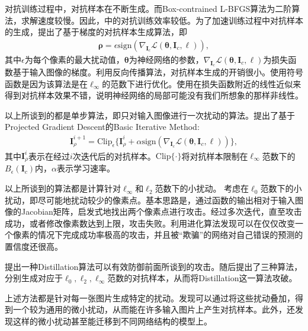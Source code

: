 对抗训练过程中，对抗样本在不断生成。而Box-contrained L-BFGS算法为二阶算法，求解速度较慢。因此，\cite{szegedy2014intriguing}中的对抗训练效率较低。为了加速训练过程中对抗样本的生成，\citet{goodfellow2015explaining}提出了基于梯度的对抗样本生成算法，即
\begin{align}
\bm{\rho} = \epsilon \text{sign} (\nabla_{\bm{I}_c} \mathcal{L} (\bm{\theta}, \bm{I}_c, \ell)),
\end{align}
其中$\epsilon$为每个像素的最大扰动值，$\bm{\theta}$为神经网络的参数，$\nabla_{\bm{I}_c} \mathcal{L} (\bm{\theta}, \bm{I}_c, \ell)$为损失函数基于输入图像的梯度。利用反向传播算法，对抗样本生成的开销很小。使用符号函数是因为该算法是在$\ell_\infty$的范数下进行优化。\citet{goodfellow2015explaining}使用在损失函数附近的线性近似来得到对抗样本效果不错，说明神经网络的局部可能没有我们所想象的那样非线性。

以上所谈到的都是单步算法，即只对输入图像进行一次扰动的算法。\citet{kurakin2016adversarial}提出了基于Projected Gradient Descent的Basic Iterative Method:
\begin{align}
\bm{I}_\rho^{i+1} = \text{Clip}_\epsilon \{\bm{I}_\rho^i + \alpha \text{sign} (\nabla_{\bm{I}_c} \mathcal{L} (\bm{\theta}, \bm{I}_c, \ell))\},
\end{align}
其中$\bm{I}_\rho^i$表示在经过$i$次迭代后的对抗样本。$\text{Clip}\{\cdot\}$将对抗样本限制在$\ell_\infty$范数下的$B_\epsilon(\bm{I}_c)$内，$\alpha$表示学习速率。

以上所谈到的算法都是计算针对$\ell_\infty$和$\ell_2$范数下的小扰动。
\citet{papernot2016limitations}考虑在$\ell_0$范数下的小扰动，即尽可能地扰动较少的像素点。\citet{papernot2016limitations}基本思路是，通过函数的输出相对于输入图像的Jacobian矩阵，启发式地找出两个像素点进行攻击。经过多次迭代，直至攻击成功，或者修改像素数达到上限，攻击失败。\citet{su2017pixel}利用进化算法发现可以在仅仅改变一个像素的情况下完成成功率极高的攻击，并且被“欺骗”的网络对自己错误的预测的置信度还很高。

\cite{papernot2016distillation}提出一种Distillation算法可以有效防御前面所谈到的\cite{szegedy2014intriguing}\cite{goodfellow2015explaining}\cite{papernot2016limitations}攻击。随后\citep{carlini2017towards}提出了三种算法，分别生成对应于$\ell_0,\ell_2,\ell_\infty$范数的对抗样本，从而将Distillation这一算法攻破。

上述方法都是针对每一张图片生成特定的扰动。\citet{Moosavi-Dezfooli_2017_CVPR}发现可以通过将这些扰动叠加，得到一个较为通用的微小扰动，从而能在许多输入图片上产生对抗样本。此外，\citet{Moosavi-Dezfooli_2017_CVPR}还发现这样的微小扰动甚至能迁移到不同网络结构的模型上。

